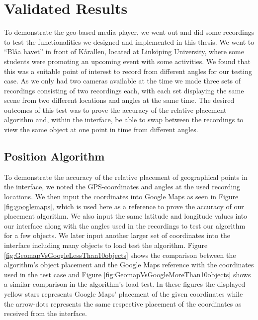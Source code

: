 \chapter{Validated Results}
\label{cha:results}

To demonstrate the geo-based media player, we went out and did some recordings to test the functionalities we designed and implemented in this thesis. We went to “Blåa havet” in front of Kårallen, located at Linköping University, where some students were promoting an upcoming event with some activities. We found that this was a suitable point of interest to record from different angles for our testing case. As we only had two cameras available at the time we made three sets of recordings consisting of two recordings each, with each set displaying the same scene from two different locations and angles at the same time. The desired outcomes of this test was to prove the accuracy of the relative placement algorithm and, within the interface, be able to swap between the recordings to view the same object at one point in time from different angles.

\section{Position Algorithm}
\label{sec:positionalgorithm}

To demonstrate the accuracy of the relative placement of geographical points in the interface, we noted the GPS-coordinates and angles at the used recording locations. We then input the coordinates into Google Maps as seen in Figure \ref{fig:googlemaps}, which is used here as a reference to prove the accuracy of our placement algorithm. We also input the same latitude and longitude values into our interface along with the angles used in the recordings to test our algorithm for a few objects. We later input another larger set of coordinates into the interface including many objects to load test the algorithm. Figure \ref{fig:GeomapVsGoogleLessThan10objects} shows the comparison between the algorithm's object placement and the Google Maps reference with the coordinates used in the test case and Figure \ref{fig:GeomapVsGoogleMoreThan10objects} shows a similar comparison in the algorithm's load test. In these figures the displayed yellow stars represents Google Maps' placement of the given coordinates while the arrow-dots represents the same respective placement of the coordinates as received from the interface.


